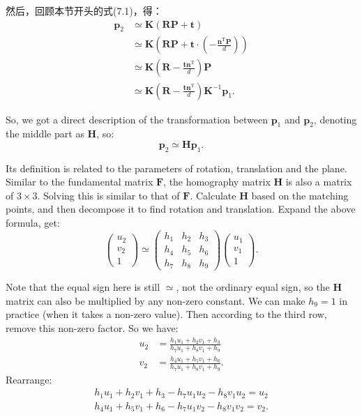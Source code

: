 然后，回顾本节开头的式(7.1)，得：
\begin{align*}
\bm{p}_2 &\simeq \bm{K} ( \bm{R} \bm{P} + \bm{t} ) \\ 
&\simeq \bm{K} \left( \bm{R} \bm{P} + \bm{t} \cdot (- \frac{\bm{n}^\mathrm{T} \bm{P} }{d}) \right) \\
&\simeq \bm{K} \left( \bm{R} - \frac{\bm{t} \bm{n}^\mathrm{T} }{d} \right) \bm{P} \\ 
&\simeq \bm{K} \left( \bm{R} - \frac{\bm{t} \bm{n}^\mathrm{T} }{d} \right) \bm{K}^{-1} \bm{p}_1.
\end{align*}

So, we got a direct description of the transformation between $\bm{p}_1$ and $\bm{p}_2$, denoting the middle part as $\bm{H}$, so:
\begin{equation}
\bm{p}_2 \simeq \bm{H} \bm{p}_1.
\end{equation}

Its definition is related to the parameters of rotation, translation and the plane. Similar to the fundamental matrix $\bm{F}$, the homography matrix $\bm{H}$ is also a matrix of $3 \times 3$. Solving this is similar to that of $\bm{F}$. Calculate $\bm{H}$ based on the matching points, and then decompose it to find rotation and translation. Expand the above formula, get:
\begin{equation}
\begin{pmatrix} 
u_{2}\\v_{2}\\1
\end{pmatrix}
\simeq
\begin{pmatrix}
 h_{1} & h_{2} & h_{3}\\ 
 h_{4} & h_{5} & h_{6}\\ 
 h_{7} & h_{8} & h_{9} 
\end{pmatrix}
\begin{pmatrix} 
u_{1}\\v_{1}\\1
\end{pmatrix}.
\end{equation}

Note that the equal sign here is still $\simeq$, not the ordinary equal sign, so the $\bm{H}$ matrix can also be multiplied by any non-zero constant. We can make $h_9 = 1$ in practice (when it takes a non-zero value). Then according to the third row, remove this non-zero factor. So we have:
\[
\begin{aligned}
u_{2}&=\frac{h_{1}u_{1}+h_{2}v_{1}+h_{3}}{h_{7}u_{1}+h_{8}v_{1}+h_{9}}\\
v_{2}&=\frac{h_{4}u_{1}+h_{5}v_{1}+h_{6}}{h_{7}u_{1}+h_{8}v_{1}+h_{9}}.
\end{aligned}
\]
Rearrange:
\[
\begin{gathered}
h_{1}u_{1}+h_{2}v_{1}+h_{3}-h_{7}u_{1}u_{2}-h_{8}v_{1}u_{2}=u_{2}\\
h_{4}u_{1}+h_{5}v_{1}+h_{6}-h_{7}u_{1}v_{2}-h_{8}v_{1}v_{2}=v_{2}.
\end{gathered}
\]

